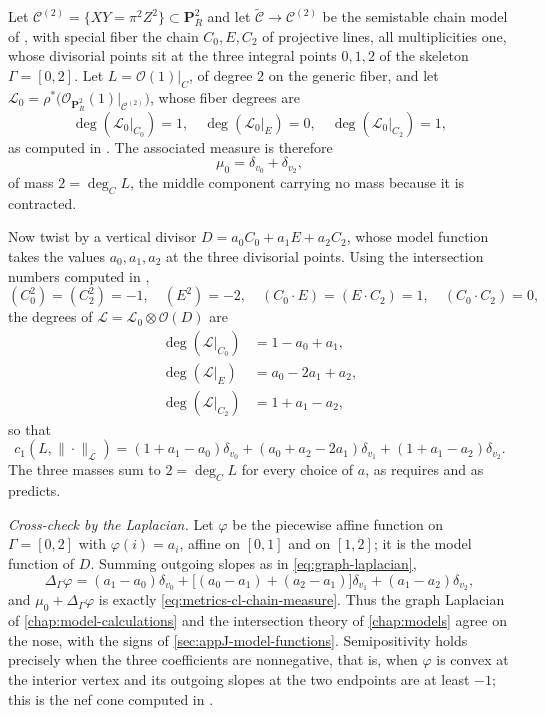 \begin{example}
\label{ex:metrics-cl-curve-chain}
Let $\mathcal C^{(2)}=\{XY=\pi^2Z^2\}\subset\mathbf P^2_R$ and let
$\widetilde{\mathcal C}\to\mathcal C^{(2)}$ be the semistable chain model
of , with special fiber the chain
$C_0,E,C_2$ of projective lines, all multiplicities one, whose divisorial
points sit at the three integral points $0,1,2$ of the skeleton
$\Gamma=[0,2]$. Let $L=\mathcal O(1)|_C$, of degree $2$ on the generic
fiber, and let
$\mathcal L_0=\rho^*\bigl(\mathcal O_{\mathbf P^2_R}(1)|_{\mathcal
C^{(2)}}\bigr)$, whose fiber degrees are
\[
 \deg(\mathcal L_0|_{C_0})=1,\quad
 \deg(\mathcal L_0|_{E})=0,\quad
 \deg(\mathcal L_0|_{C_2})=1 ,
\]
as computed in . The associated measure
is therefore
\[
 \mu_0=\delta_{v_0}+\delta_{v_2},
\]
of mass $2=\deg_CL$, the middle component carrying no mass because it is
contracted.

Now twist by a vertical divisor $D=a_0C_0+a_1E+a_2C_2$, whose model
function takes the values $a_0,a_1,a_2$ at the three divisorial points.
Using the intersection numbers computed in
,
\[
 (C_0^2)=(C_2^2)=-1,\quad (E^2)=-2,\quad
 (C_0\cdot E)=(E\cdot C_2)=1,\quad (C_0\cdot C_2)=0,
\]
the degrees of $\mathcal L=\mathcal L_0\otimes\mathcal O(D)$ are
\[
 \begin{aligned}
 \deg(\mathcal L|_{C_0})&=1-a_0+a_1,\\
 \deg(\mathcal L|_{E})&=a_0-2a_1+a_2,\\
 \deg(\mathcal L|_{C_2})&=1+a_1-a_2,
 \end{aligned}
\]
so that
\begin{equation}
\label{eq:metrics-cl-chain-measure}
 c_1(L,\|\cdot\|_{\mathcal L})
 =(1+a_1-a_0)\delta_{v_0}
 +(a_0+a_2-2a_1)\delta_{v_1}
 +(1+a_1-a_2)\delta_{v_2}.
\end{equation}
The three masses sum to $2=\deg_CL$ for every choice of $a$, as
 requires and as
 predicts.

\emph{Cross-check by the Laplacian.} Let $\varphi$ be the piecewise affine
function on $\Gamma=[0,2]$ with $\varphi(i)=a_i$, affine on $[0,1]$ and
on $[1,2]$; it is the model function of $D$. Summing outgoing slopes as
in \eqref{eq:graph-laplacian},
\[
 \Delta_\Gamma\varphi
 =(a_1-a_0)\delta_{v_0}
 +\bigl[(a_0-a_1)+(a_2-a_1)\bigr]\delta_{v_1}
 +(a_1-a_2)\delta_{v_2},
\]
and $\mu_0+\Delta_\Gamma\varphi$ is exactly
\eqref{eq:metrics-cl-chain-measure}. Thus the graph Laplacian of
\cref{chap:model-calculations} and the intersection theory of
\cref{chap:models} agree on the nose, with the signs of
\cref{sec:appJ-model-functions}. Semipositivity holds precisely when the
three coefficients are nonnegative, that is, when $\varphi$ is convex at
the interior vertex and its outgoing slopes at the two endpoints are at
least $-1$; this is the nef cone computed in
.
\end{example}

